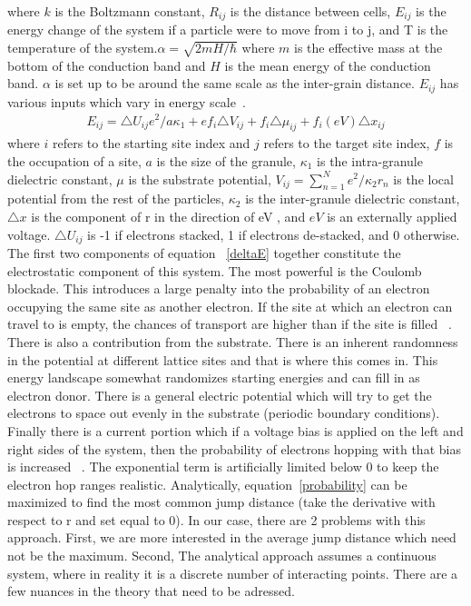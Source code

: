 where $k$ is the Boltzmann constant, $R_{ij}$ is the distance between cells, $E_{ij}$ is the energy change of the system if a particle were to move from i to j, and T is the temperature of the system.$\alpha = \sqrt{2mH/\hbar}$ where $m$ is the effective mass at the bottom of the conduction band and $H$ is the mean energy of the conduction band. $\alpha$ is set up to be around the same scale as the inter-grain distance. $E_{ij}$ has various inputs which vary in energy scale~\cite{Mott68}.
\begin{eqnarray}
E_{ij} =  \triangle U_{ij} e^2/a\kappa_1  + e f_i \triangle V_{ij} + f_i  \triangle \mu_{ij} + f_i (eV) \triangle x_{ij} 
\label{deltaE}
\end{eqnarray}
where $i$ refers to the starting site index and $j$ refers to the target site index,  $f$ is the occupation of a site, $a$ is the size of the granule, $\kappa_1$ is the intra-granule dielectric constant, $\mu$ is the substrate potential, $V_{ij} = \sum_{n=1}^{N} e^2/\kappa_2 r_{n}$ is the local potential from the rest of the particles, $\kappa_2$ is the inter-granule dielectric constant, $\triangle x$ is the component of r in the direction of eV , and $eV$ is an externally applied voltage. $\triangle U_{ij}$ is -1 if electrons stacked, 1 if electrons de-stacked, and 0 otherwise. The first two components of equation ~\ref{deltaE} together constitute the electrostatic component of this system. The most powerful is the Coulomb blockade. This introduces a large penalty into the probability of an electron occupying the same site as another electron. If the site at which an electron can travel to is empty, the chances of transport are higher than if the site is filled ~\cite{glazman05}. There is also a contribution from the substrate. There is an inherent randomness in the potential at different lattice sites and that is where this comes in. This energy landscape somewhat randomizes starting energies and can fill in as electron donor. There is a general electric potential which will try to get the electrons to space out evenly in the substrate (periodic boundary conditions). Finally there is a current portion which if a voltage bias is applied on the left and right sides of the system, then the probability of electrons hopping with that bias is increased ~\cite{aharony92}. The exponential term is artificially limited below 0 to keep the electron hop ranges realistic. Analytically, equation~\ref{probability} can be maximized to find the most common jump distance (take the derivative with respect to r and set equal to 0). In our case, there are 2 problems with this approach. First, we are more interested in the average jump distance which need not be the maximum. Second, The analytical approach assumes a continuous system, where in reality it is a discrete number of interacting points. There are a few nuances in the theory that need to be adressed.
